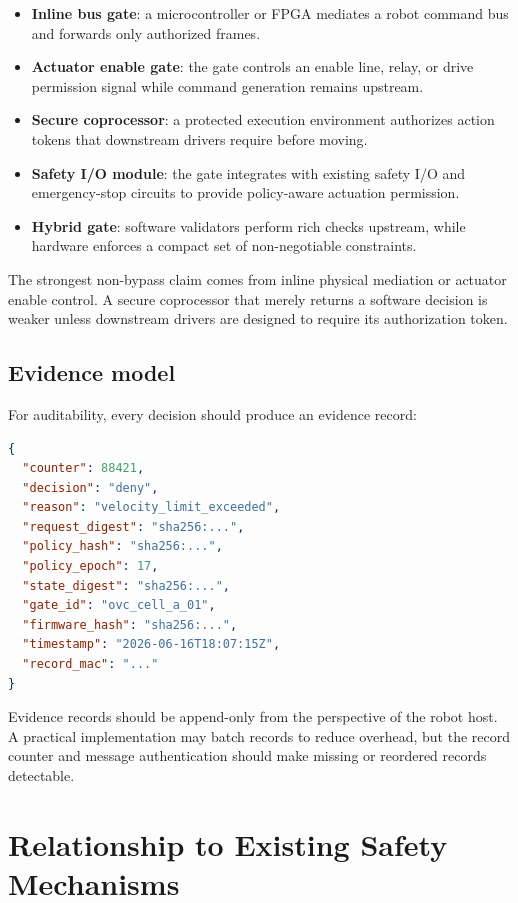 \documentclass[10pt]{article}
\begin{document}
\begin{itemize}[leftmargin=*]
  \item \textbf{Inline bus gate}: a microcontroller or FPGA mediates a robot command bus and forwards only authorized frames.
  \item \textbf{Actuator enable gate}: the gate controls an enable line, relay, or drive permission signal while command generation remains upstream.
  \item \textbf{Secure coprocessor}: a protected execution environment authorizes action tokens that downstream drivers require before moving.
  \item \textbf{Safety I/O module}: the gate integrates with existing safety I/O and emergency-stop circuits to provide policy-aware actuation permission.
  \item \textbf{Hybrid gate}: software validators perform rich checks upstream, while hardware enforces a compact set of non-negotiable constraints.
\end{itemize}

The strongest non-bypass claim comes from inline physical mediation or actuator enable control. A secure coprocessor that merely returns a software decision is weaker unless downstream drivers are designed to require its authorization token.

\subsection{Evidence model}

For auditability, every decision should produce an evidence record:

\begin{lstlisting}[language=json,caption={Example evidence record.}]
{
  "counter": 88421,
  "decision": "deny",
  "reason": "velocity_limit_exceeded",
  "request_digest": "sha256:...",
  "policy_hash": "sha256:...",
  "policy_epoch": 17,
  "state_digest": "sha256:...",
  "gate_id": "ovc_cell_a_01",
  "firmware_hash": "sha256:...",
  "timestamp": "2026-06-16T18:07:15Z",
  "record_mac": "..."
}
\end{lstlisting}

Evidence records should be append-only from the perspective of the robot host. A practical implementation may batch records to reduce overhead, but the record counter and message authentication should make missing or reordered records detectable.

\section{Relationship to Existing Safety Mechanisms}
\end{document}

